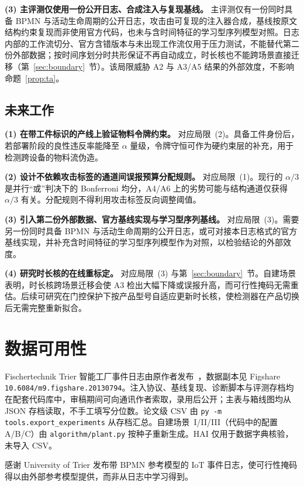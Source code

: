 \documentclass[manuscript,screen,review]{acmart}
\begin{document}
\textbf{(3) 主评测仅使用一份公开日志、合成注入与复现基线。}
主评测仅有一份同时具备 {BPMN} 与活动生命周期的公开日志，攻击由可复现的注入器合成，基线按原文结构约束复现而非使用官方代码，也未与含时间特征的学习型序列模型对照。日志内部的工作流切分、官方含错版本与未出现工作流仅用于压力测试，不能替代第二份外部数据；按时间序划分时共形保证不再自动成立，时长核也不能跨场景直接迁移（第~\ref{sec:boundary}~节）。该局限威胁 {A2} 与 {A3}/{A5} 结果的外部效度，不影响命题~\ref{prop:ta}。

\subsection{未来工作}
\label{sec:future_work}

\textbf{(1) 在带工件标识的产线上验证物料令牌约束。}
对应局限~(2)。具备工件身份后，若部署阶段的良性违反率能降至 $\alpha$ 量级，令牌守恒可作为硬约束层的补充，用于检测跨设备的物料流伪造。

\textbf{(2) 设计不依赖攻击标签的通道间误报预算分配规则。}
对应局限~(1)。现行的 $\alpha/3$ 是并行``或''判决下的 Bonferroni 均分，{A4}/{A6} 上的劣势可能与结构通道仅获得 $\alpha/3$ 有关。分配规则不得利用攻击标签反向调整阈值。

\textbf{(3) 引入第二份外部数据、官方基线实现与学习型序列基线。}
对应局限~(3)。需要另一份同时具备 {BPMN} 与活动生命周期的公开日志，或可对接本日志格式的官方基线实现，并补充含时间特征的学习型序列模型作为对照，以检验结论的外部效度。

\textbf{(4) 研究时长核的在线重标定。}
对应局限~(3) 与第~\ref{sec:boundary}~节。自建场景表明，时长核跨场景迁移会使 {A3} 检出大幅下降或误报升高，而可行性掩码无需重估。后续可研究在门控保护下按产品型号自适应更新时长核，使检测器在产品切换后无需完整重新拟合。

\section{数据可用性}
\label{sec:data}

{Fischertechnik} {Trier} 智能工厂事件日志由原作者发布~\cite{malburg2022trier}，数据副本见 {Figshare} \texttt{10.6084/m9.figshare.20130794}。注入协议、基线复现、诊断脚本与评测存档均在配套代码库中，审稿期间可向通讯作者索取，录用后公开；主表与箱线图均从 JSON 存档读取，不手工填写分位数。论文级 {CSV} 由 \texttt{py -m tools.export\_experiments} 从存档汇总。自建场景~I/II/III（代码中的配置 {A}/{B}/{C}）由 \texttt{algorithm/plant.py} 按种子重新生成。{HAI} 仅用于数据字典核验，未导入 {CSV}。

\begin{acks}
感谢 {University of Trier} 发布带 {BPMN} 参考模型的 {IoT} 事件日志，使可行性掩码得以由外部参考模型提供，而非从日志中学习得到。
\end{acks}



\end{document}
